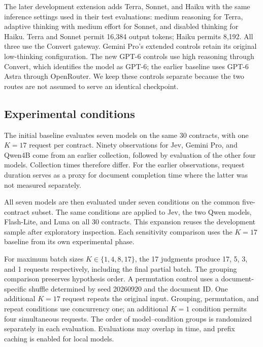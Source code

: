 The later development extension adds Terra, Sonnet, and Haiku with the same inference settings used in their test evaluations: medium reasoning for Terra, adaptive thinking with medium effort for Sonnet, and disabled thinking for Haiku. Terra and Sonnet permit 16,384 output tokens; Haiku permits 8,192. All three use the Convert gateway. Gemini Pro's extended controls retain its original low-thinking configuration. The new GPT-6 controls use high reasoning through Convert, which identifies the model as GPT-6; the earlier baseline uses GPT-6 Astra through OpenRouter. We keep these controls separate because the two routes are not assumed to serve an identical checkpoint.

\subsection{Experimental conditions}
The initial baseline evaluates seven models on the same 30 contracts, with one $K=17$ request per contract. Ninety observations for Jev, Gemini Pro, and Qwen4B come from an earlier collection, followed by evaluation of the other four models. Collection times therefore differ. For the earlier observations, request duration serves as a proxy for document completion time where the latter was not measured separately.

All seven models are then evaluated under seven conditions on the common five-contract subset. The same conditions are applied to Jev, the two Qwen models, Flash-Lite, and Luna on all 30 contracts. This expansion reuses the development sample after exploratory inspection. Each sensitivity comparison uses the $K=17$ baseline from its own experimental phase.

For maximum batch sizes $K\in\{1,4,8,17\}$, the 17 judgments produce 17, 5, 3, and 1 requests respectively, including the final partial batch. The grouping comparison preserves hypothesis order. A permutation control uses a document-specific shuffle determined by seed 20260920 and the document ID. One additional $K=17$ request repeats the original input. Grouping, permutation, and repeat conditions use concurrency one; an additional $K=1$ condition permits four simultaneous requests. The order of model--condition groups is randomized separately in each evaluation. Evaluations may overlap in time, and prefix caching is enabled for local models.

